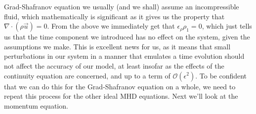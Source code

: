 Grad-Shafranov equation we usually (and we shall) assume an incompressible fluid, which mathematically is significant as it gives us the property 
that $\nabla \cdot (\rho \vec{u}) = 0$. From the above we immediately get that $\epsilon_\rho \rho_1 = 0$, which just tells us that the time component 
we introduced has no effect on the system, given the assumptions we make. This is excellent news for us, as it means that small perturbations 
in our system in a manner that emulates a time evolution should not affect the accuracy of our model, at least insofar as the effects of the 
continuity equation are concerned, and up to a term of $\mathcal{O}(\epsilon^2)$. To be confident that we can do this for the Grad-Shafranov equation on a whole, we need to repeat this process for 
the other ideal MHD equations. Next we'll look at the momentum equation.


